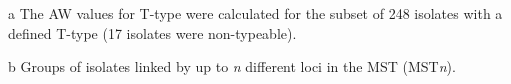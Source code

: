 \begin{table}[h!]
{\begin{threeparttable}[b]
\begin{tabular}{@{}lllllllll@{}}
        \bottomrule
    \end{tabular}
    \begin{tablenotes}
       \item [a] {\footnotesize The \ac{AW} values for T-type were calculated for the subset of 248 isolates with a defined T-type (17 isolates were non-typeable).}
       \item [b] {\footnotesize Groups of isolates linked by up to \textit{n} different loci in the MST (MST\textit{n}).}
    \end{tablenotes}
    \end{threeparttable}
    }
\end{table}
